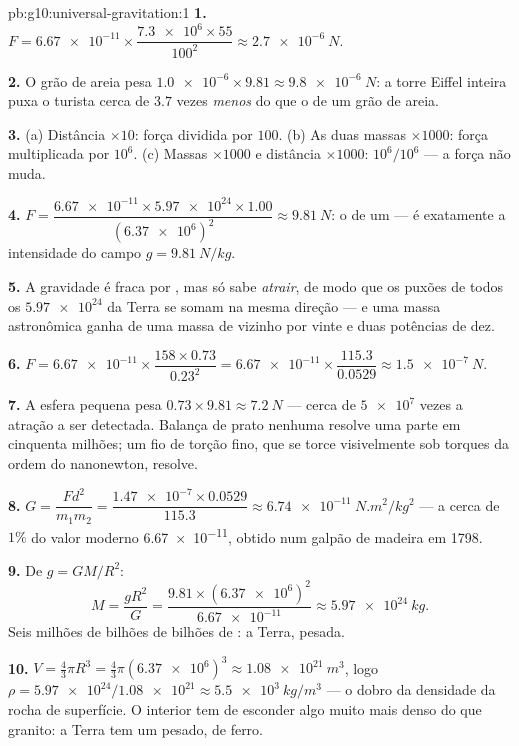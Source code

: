 \begin{solution}{pb:g10:universal-gravitation:1}
\textbf{1.} $F = \num{6.67e-11} \times
\dfrac{\num{7.3e6} \times 55}{100^2} \approx \qty{2.7e-6}{N}$.

\textbf{2.} O grão de areia pesa
$\num{1.0e-6} \times 9.81 \approx \qty{9.8e-6}{N}$: a torre Eiffel
inteira puxa o turista cerca de $3.7$ vezes \emph{menos} do que o  de
um grão de areia.

\textbf{3.} (a) Distância $\times 10$: força dividida por $100$.
(b) As duas massas $\times 1000$: força multiplicada por $10^6$.
(c) Massas $\times 1000$ e distância $\times 1000$: $10^6 / 10^6$ --- a
força não muda.

\textbf{4.} $F = \dfrac{\num{6.67e-11} \times \num{5.97e24} \times
1.00}{(\num{6.37e6})^2} \approx \qty{9.81}{N}$: o  de um 
--- é exatamente a intensidade do campo $g = \qty{9.81}{N/kg}$.

\textbf{5.} A gravidade é fraca por , mas só sabe
\emph{atrair}, de modo que os puxões de todos os $\num{5.97e24}$
 da Terra se somam na mesma direção --- e uma massa
astronômica ganha de uma massa de vizinho por vinte e duas potências de
dez.

\textbf{6.} $F = \num{6.67e-11} \times \dfrac{158 \times 0.73}{0.23^2}
= \num{6.67e-11} \times \dfrac{115.3}{0.0529}
\approx \qty{1.5e-7}{N}$.

\textbf{7.} A esfera pequena pesa
$0.73 \times 9.81 \approx \qty{7.2}{N}$ --- cerca de $\num{5e7}$ vezes a
atração a ser detectada. Balança de prato nenhuma resolve uma parte em
cinquenta milhões; um fio de torção fino, que se torce visivelmente sob
torques da ordem do nanonewton, resolve.

\textbf{8.} $G = \dfrac{F d^2}{m_1 m_2}
= \dfrac{\num{1.47e-7} \times 0.0529}{115.3}
\approx \qty{6.74e-11}{N.m^2/kg^2}$ --- a cerca de $1\%$ do valor
moderno \num{6.67e-11}, obtido num galpão de madeira em 1798.

\textbf{9.} De $g = G M / R^2$:
\[
M = \frac{g R^2}{G}
= \frac{9.81 \times (\num{6.37e6})^2}{\num{6.67e-11}}
\approx \qty{5.97e24}{kg}.
\]
Seis milhões de bilhões de bilhões de : a Terra, pesada.

\textbf{10.} $V = \frac43 \pi R^3 = \frac43 \pi
(\num{6.37e6})^3 \approx \qty{1.08e21}{m^3}$, logo
$\rho = \num{5.97e24}/\num{1.08e21} \approx \qty{5.5e3}{kg/m^3}$ --- o
dobro da densidade da rocha de superfície. O interior tem de esconder
algo muito mais denso do que granito: a Terra tem um  pesado, de
ferro.


\end{solution}
